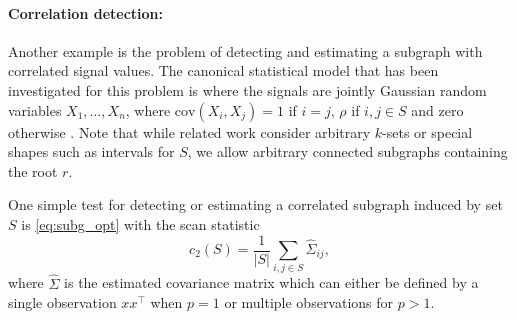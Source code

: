 \documentclass{article}
\begin{document}
\paragraph{Correlation detection:}
Another example is the problem of detecting and estimating a subgraph with correlated signal values. The canonical statistical model that has been investigated for this problem is where the signals are jointly Gaussian random variables $X_1, \ldots, X_n$, where $\mathrm{cov}(X_i, X_j) = 1$ if $i = j$, $\rho$ if $i,j \in S$ and zero otherwise \cite{arias}. Note that while related work consider arbitrary $k$-sets or special shapes such as intervals for $S$, we allow arbitrary connected subgraphs containing the root $r$.

One simple test for detecting or estimating a correlated subgraph induced by set $S$ is \eqref{eq:subg_opt} with the scan statistic
\begin{equation}
  c_2(S) = \frac{1}{|S|} \sum_{i,j \in S} \hat{\Sigma}_{ij},
  \label{eq:correlation}
\end{equation}
where $\hat{\Sigma}$ is the estimated covariance matrix which can either be defined by a single observation $x x^\top$ when $p = 1$ or multiple observations for $p > 1$.

\end{document}
